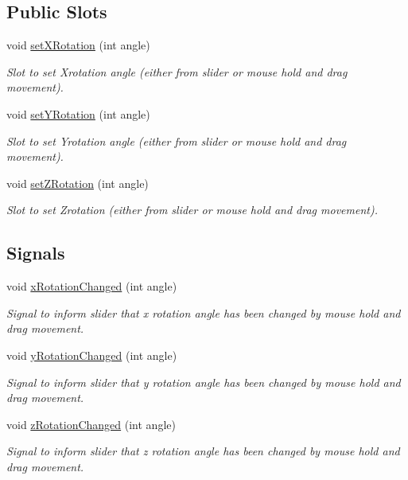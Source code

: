 \subsection*{Public Slots}
\begin{DoxyCompactItemize}
\item 
void \hyperlink{classMainWindow_a91ab701961139d21df1c4f8d7b31b870}{set\+X\+Rotation} (int angle)
\begin{DoxyCompactList}\small\item\em Slot to set Xrotation angle (either from slider or mouse hold and drag movement). \end{DoxyCompactList}\item 
void \hyperlink{classMainWindow_a023c99cfbdddc154e639d4d53b56a874}{set\+Y\+Rotation} (int angle)
\begin{DoxyCompactList}\small\item\em Slot to set Yrotation angle (either from slider or mouse hold and drag movement). \end{DoxyCompactList}\item 
void \hyperlink{classMainWindow_a3069f073ff2ba99fd601f4f607e77f8b}{set\+Z\+Rotation} (int angle)
\begin{DoxyCompactList}\small\item\em Slot to set Zrotation (either from slider or mouse hold and drag movement). \end{DoxyCompactList}\end{DoxyCompactItemize}
\subsection*{Signals}
\begin{DoxyCompactItemize}
\item 
void \hyperlink{classMainWindow_a752903ab754e432c12f954ea872c854c}{x\+Rotation\+Changed} (int angle)
\begin{DoxyCompactList}\small\item\em Signal to inform slider that x rotation angle has been changed by mouse hold and drag movement. \end{DoxyCompactList}\item 
void \hyperlink{classMainWindow_a4c0058cde1d49828b803919dfbf771c4}{y\+Rotation\+Changed} (int angle)
\begin{DoxyCompactList}\small\item\em Signal to inform slider that y rotation angle has been changed by mouse hold and drag movement. \end{DoxyCompactList}\item 
void \hyperlink{classMainWindow_a08d6c28ab348ab6626abf0168e73cd1d}{z\+Rotation\+Changed} (int angle)
\begin{DoxyCompactList}\small\item\em Signal to inform slider that z rotation angle has been changed by mouse hold and drag movement. \end{DoxyCompactList}\end{DoxyCompactItemize}
